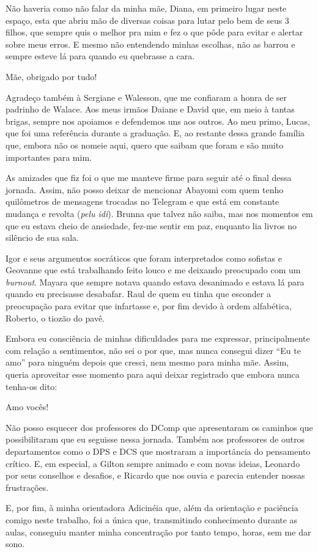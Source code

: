 \begin{agradecimentos}

Não haveria como não falar da minha mãe, Diana, em primeiro lugar neste espaço,
esta que abriu mão de diversas coisas para lutar pelo bem de seus 3 filhos, que sempre quis o melhor
pra mim e fez o que pôde para evitar e alertar sobre meus erros. E mesmo não entendendo minhas escolhas,
não as barrou e sempre esteve lá para quando eu quebrasse a cara.

Mãe, obrigado por tudo!

Agradeço também à Sergiane e Walesson, que me confiaram a honra de ser padrinho de Walace.
Aos meus irmãos Daiane e David que, em meio à tantas brigas, sempre nos apoiamos e defendemos uns aos outros.
Ao meu primo, Lucas, que foi uma referência durante a graduação. E, ao restante dessa grande família que, embora
não os nomeie aqui, quero que saibam que foram e são muito importantes para mim.

As amizades que fiz foi o que me manteve firme para seguir até o final dessa jornada. Assim, não posso deixar de mencionar
Abayomi com quem tenho quilômetros de mensagens trocadas no Telegram e que está em constante mudança e revolta (\emph{pelu idi}).
Brunna que talvez não saiba, mas nos momentos em que eu estava cheio de ansiedade, fez-me sentir em paz,
enquanto lia livros no silêncio de sua sala.

Igor e seus argumentos socráticos que foram interpretados como sofistas e Geovanne que está trabalhando feito louco e
me deixando preocupado com um \emph{burnout}. Mayara que sempre notava quando estava desanimado e estava lá para quando
eu precisasse desabafar. Raul de quem eu tinha que esconder a preocupação para evitar que infartasse e, por fim devido
à ordem alfabética, Roberto, o tiozão do pavê.

Embora eu consciência de minhas dificuldades para me expressar, principalmente com relação a sentimentos,
não sei o por que, mas nunca consegui dizer ``Eu te amo'' para ninguém depois que cresci, nem mesmo para minha mãe.
Assim, queria aproveitar esse momento para aqui deixar registrado que embora nunca tenha-os dito:

Amo vocês!

Não posso esquecer dos professores do DComp que apresentaram os caminhos que possibilitaram que eu seguisse nessa jornada.
Também aos professores de outros departamentos como o DPS e DCS que mostraram a importância do pensamento crítico.
E, em especial, a Gilton sempre animado e com novas ideias, Leonardo por seus conselhos e desafios, e Ricardo que nos ouvia
e parecia entender nossas frustrações.

E, por fim, à minha orientadora Adicinéia que, além da orientação e paciência comigo neste trabalho,
foi a única que, transmitindo conhecimento durante as aulas, conseguiu manter minha concentração por tanto tempo,
horas, sem me dar sono.

\end{agradecimentos}

